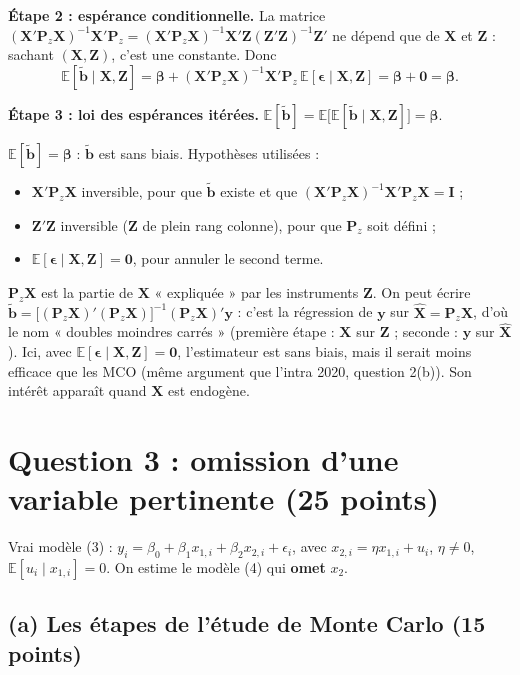 \documentclass[11pt,a4paper]{article}
\newcommand{\vy}{\mathbf{y}}\newcommand{\vX}{\mathbf{X}}\newcommand{\vZ}{\mathbf{Z}}
\newcommand{\vbeta}{\bm{\beta}}\newcommand{\veps}{\bm{\epsilon}}\newcommand{\vi}{\bm{\iota}}
\newcommand{\I}{\mathbf{I}}\newcommand{\Pm}{\mathbf{P}}\newcommand{\Mm}{\mathbf{M}}
\newcommand{\tb}{\tilde{\mathbf{b}}}
\newcommand{\E}{\mathbb{E}}\newcommand{\Var}{\operatorname{Var}}\newcommand{\Cov}{\operatorname{Cov}}
\begin{document}
\textbf{Étape 2 : espérance conditionnelle.} La matrice $(\vX'\Pm_z\vX)^{-1}\vX'\Pm_z=(\vX'\Pm_z\vX)^{-1}\vX'\vZ(\vZ'\vZ)^{-1}\vZ'$ ne dépend que de $\vX$ et $\vZ$ : sachant $(\vX,\vZ)$, c'est une constante. Donc
\[
\E[\tb\mid\vX,\vZ]=\vbeta+(\vX'\Pm_z\vX)^{-1}\vX'\Pm_z\,\E[\veps\mid\vX,\vZ]=\vbeta+\mathbf 0=\vbeta .
\]

\textbf{Étape 3 : loi des espérances itérées.} $\E[\tb]=\E\big[\E[\tb\mid\vX,\vZ]\big]=\vbeta$.

\begin{reponse}
$\E[\tb]=\vbeta$ : $\tb$ est sans biais. Hypothèses utilisées :
\begin{itemize}[nosep]
\item $\vX'\Pm_z\vX$ inversible, pour que $\tb$ existe et que $(\vX'\Pm_z\vX)^{-1}\vX'\Pm_z\vX=\I$ ;
\item $\vZ'\vZ$ inversible ($\vZ$ de plein rang colonne), pour que $\Pm_z$ soit défini ;
\item $\E[\veps\mid\vX,\vZ]=\mathbf 0$, pour annuler le second terme.
\end{itemize}
\end{reponse}

\begin{intuition}
$\Pm_z\vX$ est la partie de $\vX$ « expliquée » par les instruments $\vZ$. On peut écrire $\tb=\big[(\Pm_z\vX)'(\Pm_z\vX)\big]^{-1}(\Pm_z\vX)'\vy$ : c'est la régression de $\vy$ sur $\hat{\vX}=\Pm_z\vX$, d'où le nom « doubles moindres carrés » (première étape : $\vX$ sur $\vZ$ ; seconde : $\vy$ sur $\hat{\vX}$). Ici, avec $\E[\veps\mid\vX,\vZ]=\mathbf 0$, l'estimateur est sans biais, mais il serait moins efficace que les MCO (même argument que l'intra 2020, question 2(b)). Son intérêt apparaît quand $\vX$ est endogène.
\end{intuition}

\section{Question 3 : omission d'une variable pertinente (25 points)}

Vrai modèle (3) : $y_i=\beta_0+\beta_1x_{1,i}+\beta_2x_{2,i}+\epsilon_i$, avec $x_{2,i}=\eta x_{1,i}+u_i$, $\eta\neq0$, $\E[u_i\mid x_{1,i}]=0$. On estime le modèle (4) qui \textbf{omet} $x_2$.

\subsection*{(a) Les étapes de l'étude de Monte Carlo (15 points)}
\end{document}
